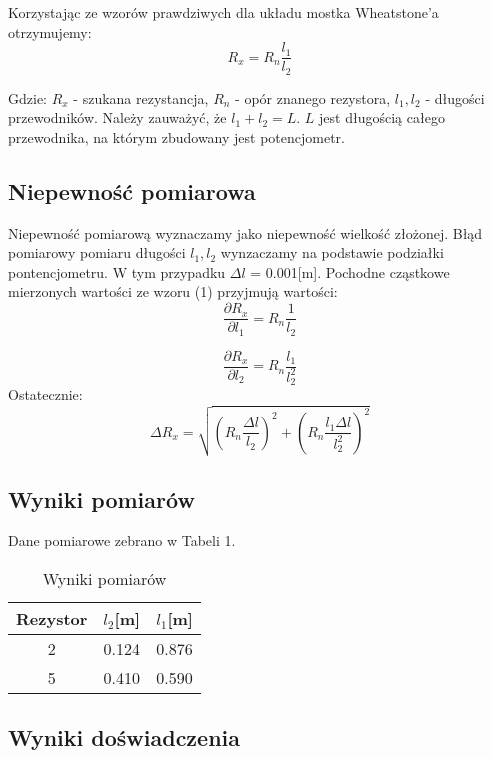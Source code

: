 \documentclass{article} %
\begin{document}
Korzystając ze wzorów prawdziwych dla układu mostka Wheatstone'a otrzymujemy:
{\large
\begin{equation}
    R_x = R_n\frac{l_1}{l_2}
\end{equation}}

Gdzie: $R_x$ - szukana rezystancja, $R_n$ - opór znanego rezystora, $l_1, l_2$ - długości przewodników. Należy zauważyć, że $l_1 + l_2 = L$. $L$ jest długością całego przewodnika, na którym zbudowany jest potencjometr.

\subsection{Niepewność pomiarowa}

Niepewność pomiarową wyznaczamy jako niepewność wielkość złożonej. Błąd pomiarowy pomiaru długości $l_1, l_2$ wynzaczamy na podstawie podziałki pontencjometru. W tym przypadku $\Delta l$ = 0.001[m]. Pochodne cząstkowe mierzonych wartości ze wzoru (1) przyjmują wartości:
{\large
\begin{equation}
\frac{\partial R_x}{\partial l_1} = R_n\frac{1}{l_2}    
\end{equation}
}

{\large
\begin{equation}
\frac{\partial R_x}{\partial l_2} = R_n\frac{l_1}{l_2^2}    
\end{equation}
}
Ostatecznie:
{\large
\begin{equation}
\Delta R_x = \sqrt{(R_n\frac{\Delta l}{l_2} )^2+(R_n\frac{l_1\Delta l}{l_2^2})^2}   
\end{equation}
}
\subsection{Wyniki pomiarów}

Dane pomiarowe zebrano w Tabeli 1.
\begin{table}[h!]
\centering
\begin{tabular}{|c|c|c|}
\hline
\textbf{Rezystor} & \textbf{$l_2$[m]} & \textbf{$l_1$[m]} \\
\hline
 2 & 0.124 & 0.876 \\
 5 & 0.410 & 0.590 \\
\hline
\end{tabular}
\caption{Wyniki pomiarów}
\label{table:students}
\end{table}

\subsection{Wyniki doświadczenia}
\end{document}

